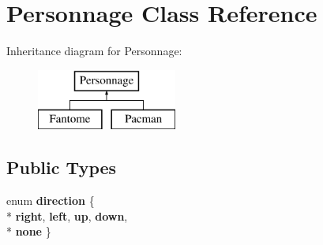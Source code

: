 \hypertarget{class_personnage}{}\section{Personnage Class Reference}
\label{class_personnage}
Inheritance diagram for Personnage\+:\begin{figure}[H]
\begin{center}
\leavevmode
\includegraphics[height=2.000000cm]{class_personnage}
\end{center}
\end{figure}
\subsection*{Public Types}
\begin{DoxyCompactItemize}
\item 
\hypertarget{class_personnage_a4fd878262e17985fe2c4d59b5d816bd5}{}enum {\bfseries direction} \{ \\*
{\bfseries right}, 
{\bfseries left}, 
{\bfseries up}, 
{\bfseries down}, 
\\*
{\bfseries none}
 \}\label{class_personnage_a4fd878262e17985fe2c4d59b5d816bd5}

\end{DoxyCompactItemize}
